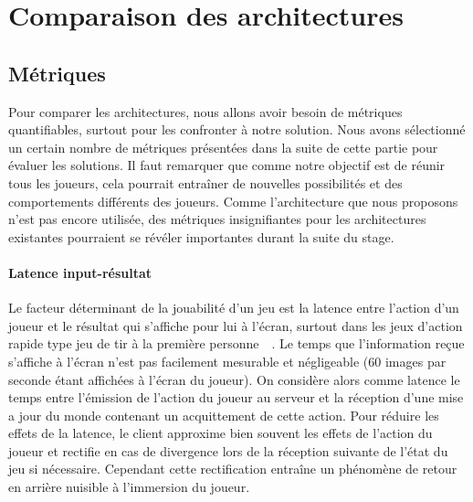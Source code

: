 \section{Comparaison des architectures}

\subsection{Métriques}

Pour comparer les architectures, nous allons avoir besoin de métriques quantifiables, surtout pour les confronter à notre solution. Nous avons sélectionné un certain nombre de métriques présentées dans la suite de cette partie pour évaluer les solutions. Il faut remarquer que comme notre objectif est de réunir tous les joueurs, cela pourrait entraîner de nouvelles possibilités et des comportements différents des joueurs. Comme l'architecture que nous proposons n'est pas encore utilisée, des métriques insignifiantes pour les architectures existantes pourraient se révéler importantes durant la suite du stage.

\paragraph{Latence input-résultat\\}
Le facteur déterminant de la jouabilité d'un jeu est la latence entre l'action d'un joueur et le résultat qui s'affiche pour lui à l'écran, surtout dans les jeux d'action rapide type jeu de tir à la première personne~\cite{latency_can_kill}~\cite{latency_and_player_actions_in_online_games}. Le temps que l'information reçue s'affiche à l'écran n'est pas facilement mesurable et négligeable (60 images par seconde étant affichées à l'écran du joueur). On considère alors comme latence le temps entre l'émission de l'action du joueur au serveur et la réception d'une mise a jour du monde contenant un acquittement de cette action. Pour réduire les effets de la latence, le client approxime bien souvent les effets de l'action du joueur et rectifie en cas de divergence lors de la réception suivante de l'état du jeu si nécessaire. Cependant cette rectification entraîne un phénomène de retour en arrière nuisible à l'immersion du joueur.

